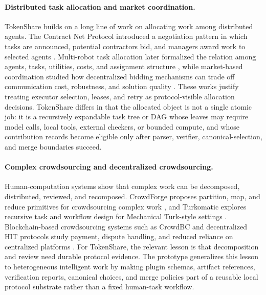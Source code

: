 \documentclass{article}
\theoremstyle{plain}
\begin{document}
\paragraph{Distributed task allocation and market coordination.}
{\color{blue}
TokenShare builds on a long line of work on allocating work among distributed agents. The Contract Net Protocol introduced a negotiation pattern in which tasks are announced, potential contractors bid, and managers award work to selected agents \citep{smith1980contract}. Multi-robot task allocation later formalized the relation among agents, tasks, utilities, costs, and assignment structure \citep{gerkey2004formal}, while market-based coordination studied how decentralized bidding mechanisms can trade off communication cost, robustness, and solution quality \citep{dias2006market}. These works justify treating executor selection, leases, and retry as protocol-visible allocation decisions. TokenShare differs in that the allocated object is not a single atomic job: it is a recursively expandable task tree or DAG whose leaves may require model calls, local tools, external checkers, or bounded compute, and whose contribution records become eligible only after parser, verifier, canonical-selection, and merge boundaries succeed.
}

\paragraph{Complex crowdsourcing and decentralized crowdsourcing.}
{\color{blue}
Human-computation systems show that complex work can be decomposed, distributed, reviewed, and recomposed. CrowdForge proposes partition, map, and reduce primitives for crowdsourcing complex work \citep{kittur2011crowdforge}, and Turkomatic explores recursive task and workflow design for Mechanical Turk-style settings \citep{kulkarni2011turkomatic}. Blockchain-based crowdsourcing systems such as CrowdBC and decentralized HIT protocols study payment, dispute handling, and reduced reliance on centralized platforms \citep{li2018crowdbc,liang2022decentralizedhit}. For TokenShare, the relevant lesson is that decomposition and review need durable protocol evidence. The prototype generalizes this lesson to heterogeneous intelligent work by making plugin schemas, artifact references, verification reports, canonical choices, and merge policies part of a reusable local protocol substrate rather than a fixed human-task workflow.
}
\end{document}
